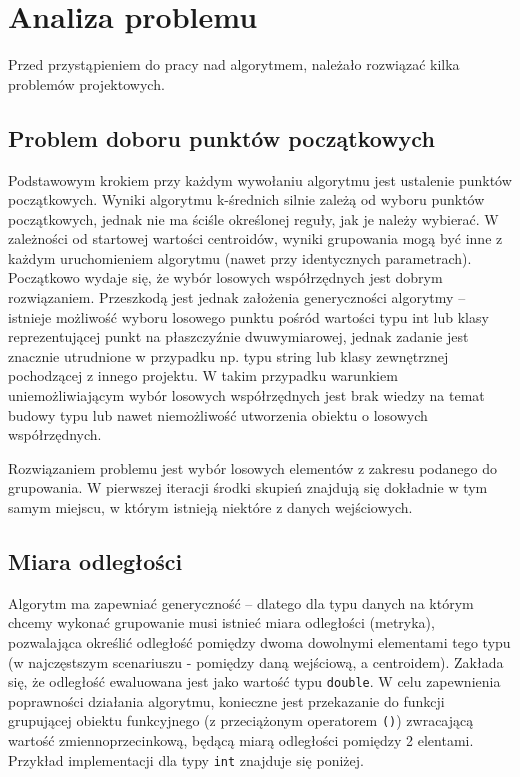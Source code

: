 \section{Analiza problemu}

Przed przystąpieniem do pracy nad algorytmem, należało rozwiązać kilka problemów projektowych.

\subsection{Problem doboru punktów początkowych}

Podstawowym krokiem przy każdym wywołaniu algorytmu jest ustalenie punktów początkowych. Wyniki algorytmu k-średnich silnie zależą od wyboru punktów początkowych, jednak nie ma ściśle określonej reguły, jak je należy wybierać. W zależności od startowej wartości centroidów, wyniki grupowania mogą być inne z każdym uruchomieniem algorytmu (nawet przy identycznych parametrach). Początkowo wydaje się, że wybór losowych współrzędnych jest dobrym rozwiązaniem. Przeszkodą jest jednak założenia generyczności algorytmy -- istnieje możliwość wyboru losowego punktu pośród wartości typu int lub klasy reprezentującej punkt na płaszczyźnie dwuwymiarowej, jednak zadanie jest znacznie utrudnione w przypadku np. typu string lub klasy zewnętrznej pochodzącej z innego projektu. W takim przypadku warunkiem uniemożliwiającym wybór losowych współrzędnych jest brak wiedzy na temat budowy typu lub nawet niemożliwość utworzenia obiektu o losowych współrzędnych.

Rozwiązaniem problemu jest wybór losowych elementów z zakresu podanego do grupowania. W pierwszej iteracji środki skupień znajdują się dokładnie w tym samym miejscu, w którym istnieją niektóre z danych wejściowych.

\subsection{Miara odległości}\label{metric}

Algorytm ma zapewniać generyczność -- dlatego dla typu danych na którym chcemy wykonać grupowanie musi istnieć miara odległości (metryka), pozwalająca określić odległość pomiędzy dwoma dowolnymi elementami tego typu (w najczęstszym scenariuszu - pomiędzy daną wejściową, a centroidem). Zakłada się, że odległość ewaluowana jest jako wartość typu \texttt{double}. W celu zapewnienia poprawności działania algorytmu, konieczne jest przekazanie do funkcji grupującej obiektu funkcyjnego (z przeciążonym operatorem \texttt{()}) zwracającą wartość zmiennoprzecinkową, będącą miarą odległości pomiędzy 2 elentami. Przykład implementacji dla typy \texttt{int} znajduje się poniżej.

